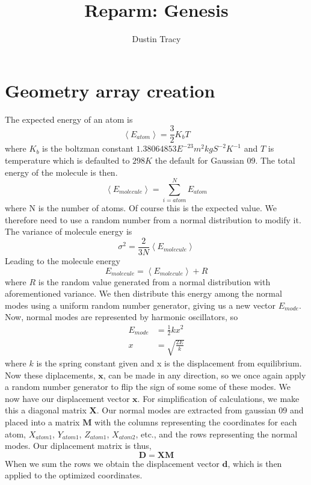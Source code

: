 \documentclass[12pt]{article}
\title{Reparm: Genesis}
\author{Dustin Tracy}
\begin{document}
\maketitle

\section{Geometry array creation}
The expected energy of an atom is
\begin{equation}
  \label{eq:energy_atom}
  \left<E_{atom}\right>=\frac{3}{2}K_{b}T
\end{equation}
where $K_b$ is the boltzman constant $1.38064853E^{-23}m^2kgS^{-2}K^{-1}$ and $T$ is temperature which is defaulted to $298K$ the default for Gaussian 09.
The total energy of the molecule is then.
\begin{equation}
  \label{eq:energy_molecule}
 \left<E_{molecule}\right>=\sum_{i=atom}^{N}E_{atom}
\end{equation}
where N is the number of atoms.
Of course this is the expected value.
We therefore need to use a random number from a normal distribution to modify it. 
The variance of molecule energy is
\begin{equation}
  \label{eq:energy_variance}
  \sigma^2=\frac{2}{3N}\left<E_{molecule}\right>
\end{equation}
Leading to the molecule energy
\begin{equation}
  \label{eq:adj_molecule_energy}
  E_{molecule}= \left<E_{molecule}\right> + R
\end{equation}
where $R$ is the random value generated from a normal distribution with aforementioned variance.
We then distribute this energy among the normal modes using a uniform random number generator, giving us a new vector $E_{mode}$.
Now, normal modes are represented by harmonic oscillators, so 
\begin{align}
  E_{mode}&=\frac{1}{2}kx^2\\
  x&=\sqrt{\frac{2E}{k}}
\end{align}
where $k$ is the spring constant given  and x is the displacement from equilibrium.
Now these diplacements, $\mathbf{x}$, can be made in any direction, so we once again apply a random number generator to flip the sign of some some of these modes.
We now have our displacement vector $\mathbf{x}$.
For simplification of calculations, we make this a diagonal matrix $\mathbf{X}$.
Our normal modes are extracted from gaussian 09 and placed into a matrix $\mathbf{M}$ with the columns representing the coordinates for each atom, $X_{atom1}$, $Y_{atom1}$, $Z_{atom1}$, $X_{atom2}$, etc., and the rows representing the normal modes.
Our diplacement matrix is thus,
\begin{equation}
  \label{eq:displacement}
 \mathbf{D}=\mathbf{XM} 
\end{equation}
When we sum the rows we obtain the displacement vector $\mathbf{d}$, which is then applied to the optimized coordinates.
\end{document}
